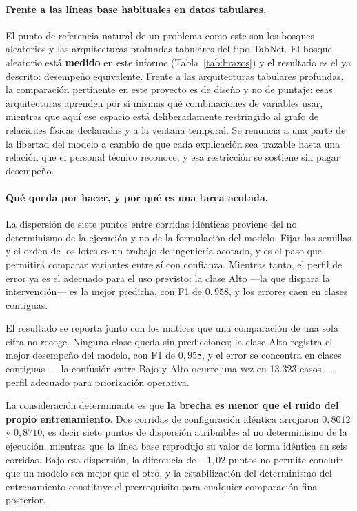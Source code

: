 \documentclass[11pt,a4paper]{article}
\begin{document}
\begin{bloquenuevo}
\paragraph{Frente a las líneas base habituales en datos tabulares.} El punto de referencia
natural de un problema como este son los bosques aleatorios y las arquitecturas profundas
tabulares del tipo TabNet. El bosque aleatorio está \textbf{medido} en este informe
(Tabla~\ref{tab:brazos}) y el resultado es el ya descrito: desempeño equivalente. Frente a las
arquitecturas tabulares profundas, la comparación pertinente en este proyecto es de diseño y no
de puntaje: esas arquitecturas aprenden por sí mismas qué combinaciones de variables usar,
mientras que aquí ese espacio está deliberadamente restringido al grafo de relaciones físicas
declaradas y a la ventana temporal. Se renuncia a una parte de la libertad del modelo a cambio
de que cada explicación sea trazable hasta una relación que el personal técnico reconoce, y esa
restricción se sostiene sin pagar desempeño.

\paragraph{Qué queda por hacer, y por qué es una tarea acotada.} La dispersión de siete puntos
entre corridas idénticas proviene del no determinismo de la ejecución y no de la formulación del
modelo. Fijar las semillas y el orden de los lotes es un trabajo de ingeniería acotado, y es el
paso que permitirá comparar variantes entre sí con confianza. Mientras tanto, el perfil de error
ya es el adecuado para el uso previsto: la clase Alto ---la que dispara la intervención--- es la
mejor predicha, con F1 de $0{,}958$, y los errores caen en clases contiguas.
\end{bloquenuevo}

El resultado se reporta junto con los matices que una comparación de una sola cifra no recoge.
Ninguna clase queda sin predicciones; la clase Alto registra el mejor desempeño del modelo, con
F1 de $0{,}958$, y el error se concentra en clases contiguas --- la confusión entre Bajo y Alto
ocurre una vez en 13.323 casos ---, perfil adecuado para priorización operativa.

La consideración determinante es que \textbf{la brecha es menor que el ruido del propio
entrenamiento}. Dos corridas de configuración idéntica arrojaron $0{,}8012$ y $0{,}8710$, es
decir siete puntos de dispersión atribuibles al no determinismo de la ejecución, mientras que la
línea base reprodujo su valor de forma idéntica en seis corridas. Bajo esa dispersión, la
diferencia de $-1{,}02$ puntos no permite concluir que un modelo sea mejor que el otro, y la
estabilización del determinismo del entrenamiento constituye el prerrequisito para cualquier
comparación fina posterior.
\end{document}
